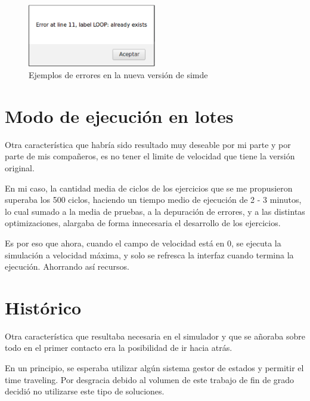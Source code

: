 \begin{figure}[!th]
\begin{center}
\includegraphics[width=0.5\textwidth]{images/cap6/nuevoerrorsimde.eps}
\caption{Ejemplos de errores en la nueva versión de simde}
\end{center}
\end{figure}

\section{Modo de ejecución en lotes}
\label{6:sec2}

Otra característica que habría sido resultado muy deseable por mi parte y por parte de mis compañeros, 
es no tener el limite de velocidad que tiene la versión original.

\bigskip
En mi caso, la cantidad media de ciclos de los ejercicios que se me propusieron superaba los 500 ciclos,
 haciendo un tiempo medio de ejecución de 2 - 3 minutos, lo cual sumado a 
la media de pruebas, a la depuración de errores, y a las distintas optimizaciones, 
alargaba de forma innecesaria el desarrollo de los ejercicios.

\bigskip
Es por eso que ahora, cuando el campo de velocidad está en 0, se ejecuta la simulación a velocidad 
máxima, y solo se refresca la interfaz cuando termina la ejecución. Ahorrando así 
recursos. 

\section{Histórico}
\label{6:sec3}

Otra característica que resultaba necesaria en el simulador y que se añoraba sobre todo en el primer
contacto era la posibilidad de ir hacia atrás.

\bigskip
En un principio, se esperaba utilizar algún sistema gestor de estados y permitir el time traveling. 
Por desgracia debido al volumen de este trabajo de fin de grado decidió no utilizarse este tipo de 
soluciones.


